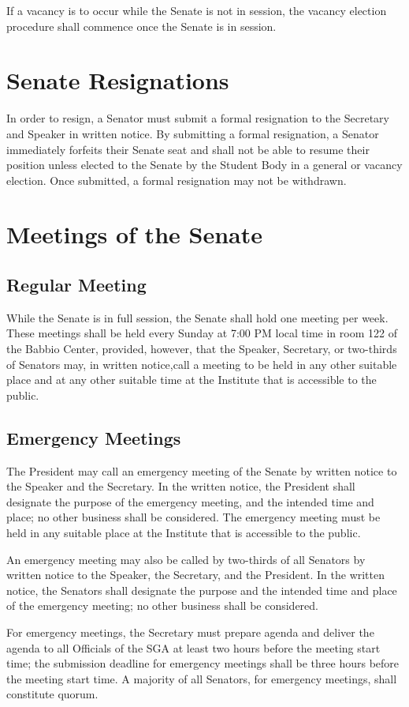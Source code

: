 \documentclass[12pt]{scrreprt}
\begin{document}
If a vacancy is to occur while the Senate is not in session, the vacancy election
procedure shall commence once the Senate is in session.

\section{Senate Resignations}
In order to resign, a Senator must submit a formal resignation to the Secretary and
Speaker in written notice. By submitting a formal resignation, a Senator immediately forfeits their Senate seat and shall not be able to resume their position
unless elected to the Senate by the Student Body in a general or vacancy election. Once submitted, a formal resignation may not be withdrawn.
\section{Meetings of the Senate}

\subsection{Regular Meeting}
While the Senate is in full session, the Senate shall hold one meeting per week. These meetings shall be held every Sunday at 7:00 PM local time in room 122 of the Babbio Center, provided, however, that the Speaker, Secretary, or two-thirds of Senators may, in written notice,call a meeting to be held in any other suitable place and at any other suitable time at the Institute that is accessible to the public.
 
\subsection{Emergency Meetings}
The President may call an emergency meeting of the Senate by written notice to the Speaker and the Secretary. In the written notice, the President shall designate the purpose of the emergency meeting, and the intended time and place; no other business shall be considered. The emergency meeting must be held in any suitable place at the Institute that is accessible to the public.

An emergency meeting may also be called by two-thirds of all Senators by written notice to the Speaker, the Secretary, and the President. In the written notice, the Senators shall designate the purpose and the intended time and place of the emergency meeting; no other business shall be considered.

For emergency meetings, the Secretary must prepare agenda and deliver the agenda to all Officials of the SGA at least two hours before the meeting start time; the submission deadline
for emergency meetings shall be three hours before the meeting start time. A majority of all Senators, for emergency meetings, shall constitute quorum.
\end{document}
